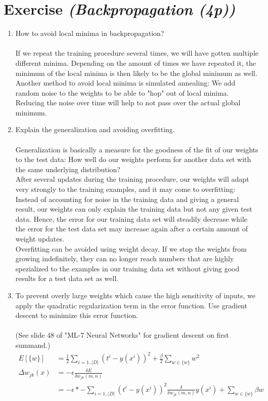 \documentclass{article}
\begin{document}
\section{Exercise \textit{(Backpropagation (4p))}}
\begin{enumerate}
    \item How to avoid local minima in backpropagation?\\
        \\
        If we repeat the training procedure several times, we will have gotten
        multiple different minima. Depending on the amount of times we have
        repeated it, the minimum of the local minima is then likely to
        be the global minimum as well.\\
        Another method to avoid local minima is simulated annealing: We add
        random noise to the weights to be able to "hop" out of local minima.
        Reducing the noise over time will help to not pass over the actual
        global minimum.
    \item Explain the generalization and avoiding overfitting.\\
        \\
        Generalization is basically a measure for the goodness of the fit of our
        weights to the test data: How well do our weights perform for another
        data set with the same underlying distribution?\\After several updates
        during the training procedure, our weights will adapt very strongly to
        the training examples, and it may come to overfitting: Instead of
        accounting for noise in the training data and giving a general result,
        our weights can only explain the training data but not any given test
        data. Hence, the error for our training data set will steadily decrease
        while the error for the test data set may increase again after a certain
        amount of weight updates.\\
        Overfitting can be avoided using weight decay. If we stop the weights
        from growing indefinitely, they can no longer reach numbers that are
        highly spezialized to the examples in our training data set without
        giving good results for a test data set as well.
    \item To prevent overly large weights which cause the high sensitivity of inputs, we apply the
        quadratic regularization term in the error function. Use gradient descent to minimize this
        error function.\\
        \\
        (See slide 48 of "ML-7 Neural Networks" for gradient descent on first
        summand.)
        \begin{align*}
            E[\{w\}] &= \frac{1}{2}\sum_{i=1..|D|}(t^i-y(x^i))^2+\frac{\beta}{2}
            \sum_{w \in \{w\}}w^2\\
            \Delta w_{jk}(x) &= -\epsilon \frac{\delta E}{\delta w_{jk}(m,n)}\\
                             &= -\epsilon * -\sum_{i=1..|D|}(t^i-y(x^i))^2
            \frac{\delta}{\delta w_{jk}(m,n)}y(x^i) + \sum_{w \in \{w\}}\beta w
        \end{align*}

\end{enumerate}
\end{document}
